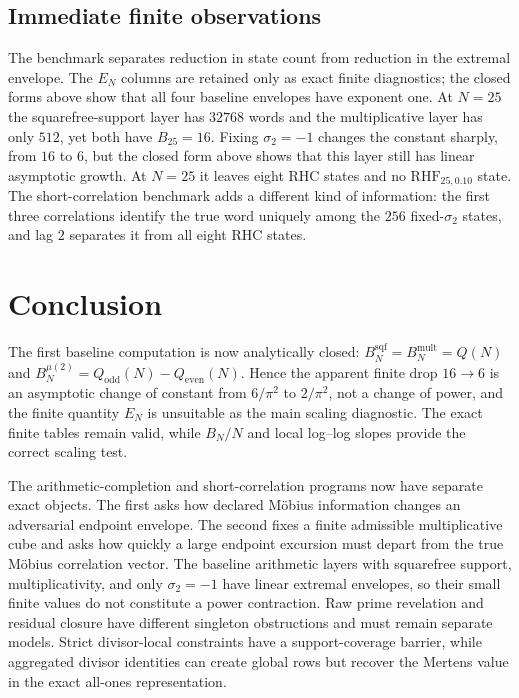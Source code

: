 \documentclass[11pt]{article}
\newcommand{\RHF}{\mathrm{RHF}}
\begin{document}
\subsection{Immediate finite observations}
The benchmark separates reduction in state count from reduction in the extremal envelope. The $E_N$ columns are retained only as exact finite diagnostics; the closed forms above show that all four baseline envelopes have exponent one. At $N=25$ the squarefree-support layer has $32768$ words and the multiplicative layer has only $512$, yet both have $B_{25}=16$. Fixing $\sigma_2=-1$ changes the constant sharply, from $16$ to $6$, but the closed form above shows that this layer still has linear asymptotic growth. At $N=25$ it leaves eight RHC states and no $\RHF_{25,0.10}$ state. The short-correlation benchmark adds a different kind of information: the first three correlations identify the true word uniquely among the $256$ fixed-$\sigma_2$ states, and lag $2$ separates it from all eight RHC states.


\section{Conclusion}
The first baseline computation is now analytically closed: $B_N^{\mathrm{sqf}}=B_N^{\mathrm{mult}}=Q(N)$ and $B_N^{\mu(2)}=Q_{\mathrm{odd}}(N)-Q_{\mathrm{even}}(N)$. Hence the apparent finite drop $16\to6$ is an asymptotic change of constant from $6/\pi^2$ to $2/\pi^2$, not a change of power, and the finite quantity $E_N$ is unsuitable as the main scaling diagnostic. The exact finite tables remain valid, while $B_N/N$ and local log--log slopes provide the correct scaling test.

The arithmetic-completion and short-correlation programs now have separate exact objects. The first asks how declared Möbius information changes an adversarial endpoint envelope. The second fixes a finite admissible multiplicative cube and asks how quickly a large endpoint excursion must depart from the true Möbius correlation vector. The baseline arithmetic layers with squarefree support, multiplicativity, and only $\sigma_2=-1$ have linear extremal envelopes, so their small finite values do not constitute a power contraction. Raw prime revelation and residual closure have different singleton obstructions and must remain separate models. Strict divisor-local constraints have a support-coverage barrier, while aggregated divisor identities can create global rows but recover the Mertens value in the exact all-ones representation.
\end{document}
